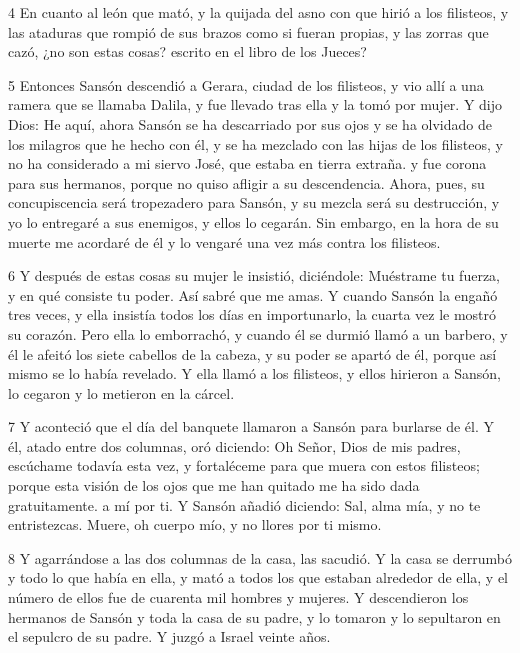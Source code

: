 \par 4 En cuanto al león que mató, y la quijada del asno con que hirió a los filisteos, y las ataduras que rompió de sus brazos como si fueran propias, y las zorras que cazó, ¿no son estas cosas? escrito en el libro de los Jueces?

\par 5 Entonces Sansón descendió a Gerara, ciudad de los filisteos, y vio allí a una ramera que se llamaba Dalila, y fue llevado tras ella y la tomó por mujer. Y dijo Dios: He aquí, ahora Sansón se ha descarriado por sus ojos y se ha olvidado de los milagros que he hecho con él, y se ha mezclado con las hijas de los filisteos, y no ha considerado a mi siervo José, que estaba en tierra extraña. y fue corona para sus hermanos, porque no quiso afligir a su descendencia. Ahora, pues, su concupiscencia será tropezadero para Sansón, y su mezcla será su destrucción, y yo lo entregaré a sus enemigos, y ellos lo cegarán. Sin embargo, en la hora de su muerte me acordaré de él y lo vengaré una vez más contra los filisteos.

\par 6 Y después de estas cosas su mujer le insistió, diciéndole: Muéstrame tu fuerza, y en qué consiste tu poder. Así sabré que me amas. Y cuando Sansón la engañó tres veces, y ella insistía todos los días en importunarlo, la cuarta vez le mostró su corazón. Pero ella lo emborrachó, y cuando él se durmió llamó a un barbero, y él le afeitó los siete cabellos de la cabeza, y su poder se apartó de él, porque así mismo se lo había revelado. Y ella llamó a los filisteos, y ellos hirieron a Sansón, lo cegaron y lo metieron en la cárcel.

\par 7 Y aconteció que el día del banquete llamaron a Sansón para burlarse de él. Y él, atado entre dos columnas, oró diciendo: Oh Señor, Dios de mis padres, escúchame todavía esta vez, y fortaléceme para que muera con estos filisteos; porque esta visión de los ojos que me han quitado me ha sido dada gratuitamente. a mí por ti. Y Sansón añadió diciendo: Sal, alma mía, y no te entristezcas. Muere, oh cuerpo mío, y no llores por ti mismo.

\par 8 Y agarrándose a las dos columnas de la casa, las sacudió. Y la casa se derrumbó y todo lo que había en ella, y mató a todos los que estaban alrededor de ella, y el número de ellos fue de cuarenta mil hombres y mujeres. Y descendieron los hermanos de Sansón y toda la casa de su padre, y lo tomaron y lo sepultaron en el sepulcro de su padre. Y juzgó a Israel veinte años.

